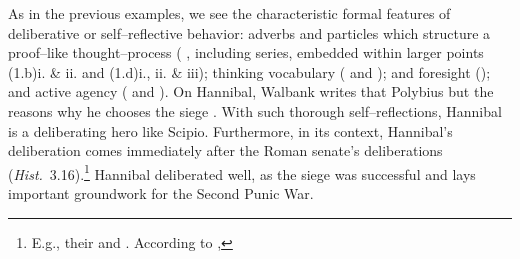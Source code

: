 \documentclass[12pt,letterpaper,oneside,final]{memoir}
\begin{document}
\begin{enumerate}
\end{enumerate} \DoubleSpacing As in the previous examples, we see the characteristic formal features of deliberative or self--reflective behavior: adverbs and particles which structure a proof--like thought--process ( , including  series, embedded within larger points (1.b)i. \& ii. and (1.d)i., ii. \& iii); thinking vocabulary (   and ); and foresight (); and active agency ( and ). On Hannibal, Walbank writes that  Polybius  but the reasons why he chooses the siege \parencite[329]{walbank1957}. With such thorough self--reflections, Hannibal is a deliberating hero like Scipio. Furthermore, in its context, Hannibal's deliberation comes immediately after the Roman senate's deliberations (\emph{Hist.}~3.16).\footnote{E.g., their  and . According to \textcite[327]{walbank1957}, } Hannibal deliberated well, as the siege was successful and lays important groundwork for the Second Punic War.
\end{document}
